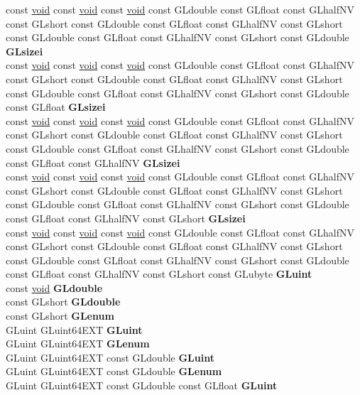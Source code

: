 \begin{DoxyCompactItemize}
\begin{tabbing}
\>const \hyperlink{interfacevoid}{void} const \hyperlink{interfacevoid}{void} const \hyperlink{interfacevoid}{void} const GLdouble const GLfloat const GLhalfNV const GLshort const GLdouble const GLfloat const GLhalfNV const GLshort const GLdouble const GLfloat const GLhalfNV const GLshort const GLdouble {\bfseries GLsizei}\\
\>const \hyperlink{interfacevoid}{void} const \hyperlink{interfacevoid}{void} const \hyperlink{interfacevoid}{void} const GLdouble const GLfloat const GLhalfNV const GLshort const GLdouble const GLfloat const GLhalfNV const GLshort const GLdouble const GLfloat const GLhalfNV const GLshort const GLdouble const GLfloat {\bfseries GLsizei}\\
\>const \hyperlink{interfacevoid}{void} const \hyperlink{interfacevoid}{void} const \hyperlink{interfacevoid}{void} const GLdouble const GLfloat const GLhalfNV const GLshort const GLdouble const GLfloat const GLhalfNV const GLshort const GLdouble const GLfloat const GLhalfNV const GLshort const GLdouble const GLfloat const GLhalfNV {\bfseries GLsizei}\\
\>const \hyperlink{interfacevoid}{void} const \hyperlink{interfacevoid}{void} const \hyperlink{interfacevoid}{void} const GLdouble const GLfloat const GLhalfNV const GLshort const GLdouble const GLfloat const GLhalfNV const GLshort const GLdouble const GLfloat const GLhalfNV const GLshort const GLdouble const GLfloat const GLhalfNV const GLshort {\bfseries GLsizei}\\
\>const \hyperlink{interfacevoid}{void} const \hyperlink{interfacevoid}{void} const \hyperlink{interfacevoid}{void} const GLdouble const GLfloat const GLhalfNV const GLshort const GLdouble const GLfloat const GLhalfNV const GLshort const GLdouble const GLfloat const GLhalfNV const GLshort const GLdouble const GLfloat const GLhalfNV const GLshort const GLubyte {\bfseries GLuint}\\
\>const \hyperlink{interfacevoid}{void} {\bfseries GLdouble}\\
\>const GLshort {\bfseries GLdouble}\\
\>const GLshort {\bfseries GLenum}\\
\>GLuint GLuint64EXT {\bfseries GLuint}\\
\>GLuint GLuint64EXT {\bfseries GLenum}\\
\>GLuint GLuint64EXT const GLdouble {\bfseries GLuint}\\
\>GLuint GLuint64EXT const GLdouble {\bfseries GLenum}\\
\>GLuint GLuint64EXT const GLdouble const GLfloat {\bfseries GLuint}\\

\end{tabbing}
\end{DoxyCompactItemize}
